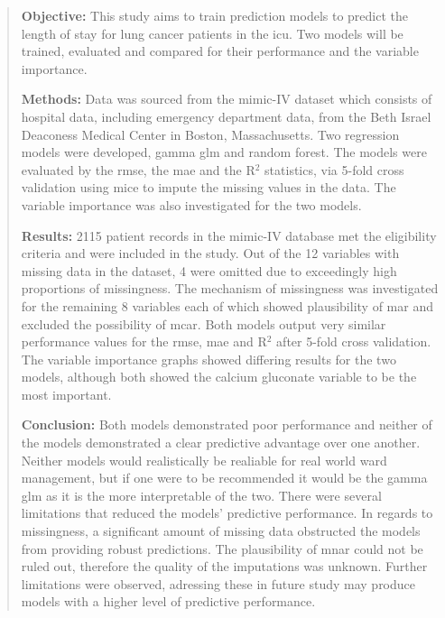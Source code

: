 \documentclass[11pt]{article}
\begin{document}

\newpage


\begin{abstract}

\textbf{Objective:} This study aims to train prediction models to predict the length of stay for lung cancer patients in the \gls{icu}. Two models will be trained, evaluated and compared for their performance and the variable importance.

\textbf{Methods:} Data was sourced from the \gls{mimic}-IV dataset which consists of hospital data, including emergency department data, from the Beth Israel Deaconess Medical Center in Boston, Massachusetts. Two regression models were developed, gamma \gls{glm} and random forest. The models were evaluated by the \gls{rmse}, the \gls{mae} and the R\(^2\) statistics, via 5-fold cross validation using \gls{mice} to impute the missing values in the data. The variable importance was also investigated for the two models.

\textbf{Results:} 2115 patient records in the \gls{mimic}-IV database met the eligibility criteria and were included in the study. Out of the 12 variables with missing data in the dataset, 4 were omitted due to exceedingly high proportions of missingness. The mechanism of missingness was investigated for the remaining 8 variables each of which showed plausibility of \gls{mar} and excluded the possibility of \gls{mcar}. Both models output very similar performance values for the \gls{rmse}, \gls{mae} and R\(^2\) after 5-fold cross validation. The variable importance graphs showed differing results for the two models, although both showed the calcium gluconate variable to be the most important.

\textbf{Conclusion:} Both models demonstrated poor performance and neither of the models demonstrated a clear predictive advantage over one another. Neither models would realistically be realiable for real world ward management, but if one were to be recommended it would be the gamma \gls{glm} as it is the more interpretable of the two. There were several limitations that reduced the models' predictive performance. In regards to missingness, a significant amount of missing data obstructed the models from providing robust predictions. The plausibility of \gls{mnar} could not be ruled out, therefore the quality of the imputations was unknown. Further limitations were observed, adressing these in future study may produce models with a higher level of predictive performance.
    
\end{abstract}
\end{document}
